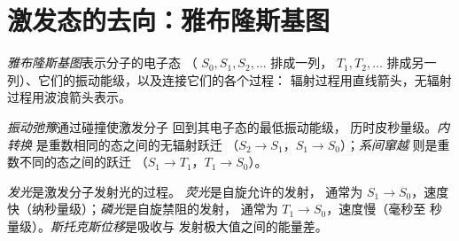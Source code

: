 \section{激发态的去向：雅布隆斯基图}

\begin{definition}[雅布隆斯基图]\label{def:b3:electronic-spectroscopy:jablonski}
\emph{雅布隆斯基图}表示分子的电子态
（ $S_0, S_1, S_2, \dots$ 排成一列， $T_1, T_2,
\dots$ 排成另一列）、它们的振动能级，以及连接它们的各个过程：
辐射过程用直线箭头，无辐射过程用波浪箭头表示。
\end{definition}

\begin{definition}[无辐射过程]\label{def:b3:electronic-spectroscopy:radiationless}
\emph{振动弛豫}通过碰撞使激发分子
回到其电子态的最低振动能级，
历时皮秒量级。\emph{内转换}
是重数相同的态之间的无辐射跃迁
（$S_2 \to S_1$，$S_1 \to S_0$）；\emph{系间窜越}
则是重数不同的态之间的跃迁
（$S_1 \to T_1$，$T_1 \to S_0$）。
\end{definition}

\begin{definition}[发光、荧光、磷光、斯托克斯位移]\label{def:b3:electronic-spectroscopy:luminescence}
\emph{发光}是激发分子发射光的过程。
\emph{荧光}是自旋允许的发射，
通常为 $S_1 \to S_0$，速度快（纳秒量级）；\emph{磷光}是自旋禁阻的发射，
通常为 $T_1 \to S_0$，速度慢（毫秒至
秒量级）。\emph{斯托克斯位移}是吸收与
发射极大值之间的能量差。
\end{definition}

